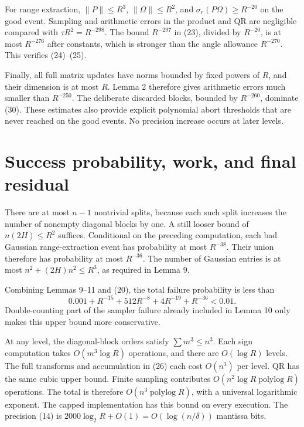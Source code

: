 \documentclass[10pt,a4paper]{article}
\begin{document}
For range extraction, \(\|P\|\le R^3\), \(\|\Omega\|\le R^2\), and
\(\sigma_r(P\Omega)\ge R^{-20}\) on the good event. Sampling and
arithmetic errors in the product and QR are negligible compared with
\(\tau R^2=R^{-298}\). The bound \(R^{-297}\) in (23), divided by
\(R^{-20}\), is at most \(R^{-276}\) after constants, which is stronger
than the angle allowance \(R^{-270}\). This verifies (24)--(25).

Finally, all full matrix updates have norms bounded by fixed powers of
\(R\), and their dimension is at most \(R\). Lemma 2 therefore gives
arithmetic errors much smaller than \(R^{-250}\). The deliberate
discarded blocks, bounded by \(R^{-260}\), dominate (30). These
estimates also provide explicit polynomial abort thresholds that are
never reached on the good events. No precision increase occurs at later
levels.

\section{Success probability, work, and final
residual}\label{success-probability-work-and-final-residual}

There are at most \(n-1\) nontrivial splits, because each such split
increases the number of nonempty diagonal blocks by one. A still looser
bound of \(n(2H)\le R^2\) suffices. Conditional on the preceding
computation, each bad Gaussian range-extraction event has probability at
most \(R^{-38}\). Their union therefore has probability at most
\(R^{-36}\). The number of Gaussian entries is at most
\(n^2+(2H)n^2\le R^3\), as required in Lemma 9.

Combining Lemmas 9--11 and (20), the total failure probability is less
than \[
 0.001+R^{-15}+512R^{-8}+4R^{-19}+R^{-36}<0.01.
\] Double-counting part of the sampler failure already included in Lemma
10 only makes this upper bound more conservative.

At any level, the diagonal-block orders satisfy \(\sum m^3\le n^3\).
Each sign computation takes \(O(m^3\log R)\) operations, and there are
\(O(\log R)\) levels. The full transforms and accumulation in (26) each
cost \(O(n^3)\) per level. QR has the same cubic upper bound. Finite
sampling contributes \(O(n^2\log R\operatorname{polylog}R)\) operations.
The total is therefore \(O(n^3\operatorname{polylog}R)\), with a
universal logarithmic exponent. The capped implementation has this bound
on every execution. The precision (14) is
\(2000\log_2R+O(1)=O(\log(n/\delta))\) mantissa bits.
\end{document}
